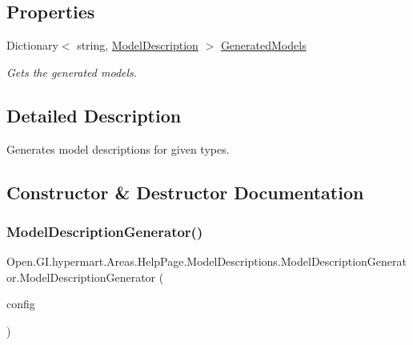 \subsection*{Properties}
\begin{DoxyCompactItemize}
\item 
Dictionary$<$ string, \hyperlink{class_open_1_1_g_i_1_1hypermart_1_1_areas_1_1_help_page_1_1_model_descriptions_1_1_model_description}{Model\+Description} $>$ \hyperlink{class_open_1_1_g_i_1_1hypermart_1_1_areas_1_1_help_page_1_1_model_descriptions_1_1_model_description_generator_ad4d703c3da52e11a1e52c12ae04e88a6}{Generated\+Models}
\begin{DoxyCompactList}\small\item\em Gets the generated models. \end{DoxyCompactList}\end{DoxyCompactItemize}


\subsection{Detailed Description}
Generates model descriptions for given types. 



\subsection{Constructor \& Destructor Documentation}
\hypertarget{class_open_1_1_g_i_1_1hypermart_1_1_areas_1_1_help_page_1_1_model_descriptions_1_1_model_description_generator_a56c6ca4b29667cf648929f4bbedca964}{}\label{class_open_1_1_g_i_1_1hypermart_1_1_areas_1_1_help_page_1_1_model_descriptions_1_1_model_description_generator_a56c6ca4b29667cf648929f4bbedca964} 
\subsubsection{\texorpdfstring{Model\+Description\+Generator()}{ModelDescriptionGenerator()}}
{\footnotesize\ttfamily Open.\+G\+I.\+hypermart.\+Areas.\+Help\+Page.\+Model\+Descriptions.\+Model\+Description\+Generator.\+Model\+Description\+Generator (\begin{DoxyParamCaption}\item[{Http\+Configuration}]{config }\end{DoxyParamCaption})}



